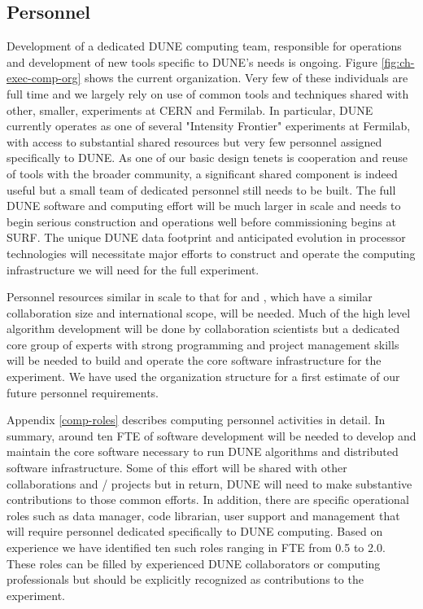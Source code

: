 \subsection{Personnel}


Development of a  dedicated DUNE computing team, responsible for operations and development of new tools specific to DUNE's needs is ongoing. 
Figure \ref{fig:ch-exec-comp-org} shows the current organization.  Very few of these individuals are full time and we largely rely on use of common tools and techniques shared with other, smaller, experiments at CERN and Fermilab. In particular, DUNE currently operates as one of several "Intensity Frontier" experiments at Fermilab, with access to substantial shared resources but very few personnel assigned specifically to DUNE.  As one of our basic design tenets is cooperation and reuse of tools with the broader community, a significant shared component is indeed useful but a small team of dedicated personnel still needs to be built. 
The full DUNE software and computing effort will be much larger in scale and needs to begin serious construction and operations well before commissioning begins at SURF. The unique DUNE data footprint and anticipated evolution in processor technologies will necessitate major efforts to construct and operate the computing infrastructure we will need for the full experiment.

Personnel resources similar in scale to that for  and , which have a similar collaboration size and international scope, will be needed.  
Much of the high level algorithm development will be done by collaboration scientists but a dedicated core group of experts with strong programming and project management skills will be needed to build and operate the core software infrastructure for the experiment.  We have used the  organization structure for a first estimate of our future personnel requirements.

Appendix \ref{comp-roles} describes  computing personnel activities in detail.  In summary, around ten FTE of software development will be needed to develop and maintain the core software necessary to run DUNE algorithms and distributed software infrastructure.  Some of this effort will be shared with other collaborations and / projects but in return, DUNE will need to make substantive contributions to those common efforts. In addition, there are specific operational roles such as data manager, code librarian, user support and management that will require personnel dedicated specifically to DUNE computing. Based on  experience we have identified ten such roles ranging in FTE from 0.5 to 2.0.  These roles can be filled by experienced DUNE collaborators or computing professionals but should be explicitly recognized as contributions to the experiment. 



